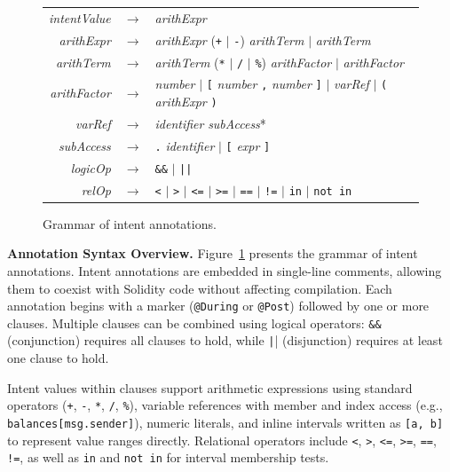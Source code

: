 \documentclass[pdflatex,sn-basic]{sn-jnl}%
\theoremstyle{thmstyleone}%
\theoremstyle{thmstyletwo}%
\theoremstyle{thmstylethree}%
\begin{document}
\begin{figure}[t]
\begin{tabular}{@{}r@{\quad}c@{\quad}l@{}}
\textit{intentValue} & $\rightarrow$ & \textit{arithExpr} \\[2pt]
\textit{arithExpr} & $\rightarrow$ & \textit{arithExpr} (\texttt{+} $|$ \texttt{-}) \textit{arithTerm} $|$ \textit{arithTerm} \\
\textit{arithTerm} & $\rightarrow$ & \textit{arithTerm} (\texttt{*} $|$ \texttt{/} $|$ \texttt{\%}) \textit{arithFactor} $|$ \textit{arithFactor} \\
\textit{arithFactor} & $\rightarrow$ & \textit{number} $|$ \texttt{[} \textit{number} \texttt{,} \textit{number} \texttt{]} $|$ \textit{varRef} $|$ \texttt{(} \textit{arithExpr} \texttt{)} \\[2pt]
\textit{varRef} & $\rightarrow$ & \textit{identifier} \textit{subAccess}* \\
\textit{subAccess} & $\rightarrow$ & \texttt{.} \textit{identifier} $|$ \texttt{[} \textit{expr} \texttt{]} \\[6pt]

\textit{logicOp} & $\rightarrow$ & \texttt{\&\&} $|$ \texttt{||} \\
\textit{relOp} & $\rightarrow$ & \texttt{<} $|$ \texttt{>} $|$ \texttt{<=} $|$ \texttt{>=} $|$ \texttt{==} $|$ \texttt{!=} $|$ \texttt{in} $|$ \texttt{not in} \\
\end{tabular}
\caption{Grammar of intent annotations.}
\label{fig:intent-grammar}
\end{figure}

\smallskip
\noindent\textbf{Annotation Syntax Overview.}
Figure~\ref{fig:intent-grammar} presents the grammar of intent annotations.
Intent annotations are embedded in single-line comments, allowing them to coexist with Solidity code without affecting compilation.
Each annotation begins with a marker (\texttt{@During} or \texttt{@Post}) followed by one or more clauses.
Multiple clauses can be combined using logical operators: \texttt{\&\&} (conjunction) requires all clauses to hold, while \texttt{|}| (disjunction) requires at least one clause to hold.

Intent values within clauses support arithmetic expressions using standard operators (\texttt{+}, \texttt{-}, \texttt{*}, \texttt{/}, \texttt{\%}), variable references with member and index access (e.g., \texttt{balances[msg.sender]}), numeric literals, and inline intervals written as \texttt{[a, b]} to represent value ranges directly.
Relational operators include \texttt{<}, \texttt{>}, \texttt{<=}, \texttt{>=}, \texttt{==}, \texttt{!=}, as well as \texttt{in} and \texttt{not in} for interval membership tests.
\end{document}

